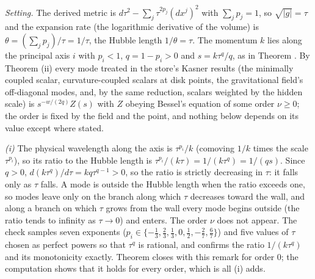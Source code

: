 \emph{Setting.} The derived metric is $d\tau^{2} - \sum_{j}\tau^{2p_{j}}(dx^{j})^{2}$ with $\sum_{j}p_{j} = 1$, so $\sqrt{|g|} = \tau$ and the expansion rate (the logarithmic derivative of the volume) is $\theta = (\sum_{j}p_{j})/\tau = 1/\tau$, the Hubble length $1/\theta = \tau$. The momentum $k$ lies along the principal axis $i$ with $p_{i} < 1$, $q = 1 - p_{i} > 0$ and $s = k\tau^{q}/q$, as in Theorem . By Theorem (ii) every mode treated in the store's Kasner results (the minimally coupled scalar, curvature-coupled scalars at disk points, the gravitational field's off-diagonal modes, and, by the same reduction, scalars weighted by the hidden scale) is $s^{-w/(2q)}Z(s)$ with $Z$ obeying Bessel's equation of some order $\nu \ge 0$; the order is fixed by the field and the point, and nothing below depends on its value except where stated.

\emph{(i)} The physical wavelength along the axis is $\tau^{p_{i}}/k$ (comoving $1/k$ times the scale $\tau^{p_{i}}$), so its ratio to the Hubble length is $\tau^{p_{i}}/(k\tau) = 1/(k\tau^{q}) = 1/(qs)$. Since $q > 0$, $d(k\tau^{q})/d\tau = kq\tau^{q - 1} > 0$, so the ratio is strictly decreasing in $\tau$: it falls only as $\tau$ falls. A mode is outside the Hubble length when the ratio exceeds one, so modes leave only on the branch along which $\tau$ decreases toward the wall, and along a branch on which $\tau$ grows from the wall every mode begins outside (the ratio tends to infinity as $\tau \to 0$) and enters. The order $\nu$ does not appear. The check samples seven exponents ($p_{i} \in \{-\tfrac13, \tfrac23, \tfrac13, 0, \tfrac12, -\tfrac27, \tfrac67\}$) and five values of $\tau$ chosen as perfect powers so that $\tau^{q}$ is rational, and confirms the ratio $1/(k\tau^{q})$ and its monotonicity exactly. Theorem  closes with this remark for order $0$; the computation shows that it holds for every order, which is all (i) adds.

